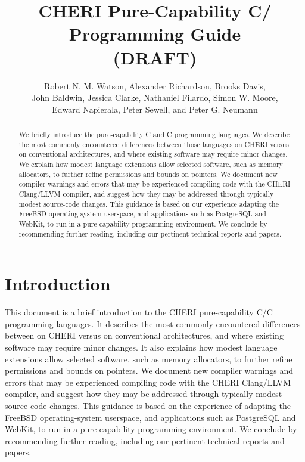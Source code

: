 \documentclass[12pt,twoside,openright,a4paper]{article}
\title{CHERI Pure-Capability C/\cppInHeader{} Programming Guide \\ (DRAFT)}
\author{Robert N. M. Watson, Alexander Richardson, Brooks Davis, \\
  John Baldwin, Jessica Clarke, Nathaniel Filardo, Simon W. Moore, \\
  Edward Napierala, Peter Sewell, and Peter G. Neumann}
\newcommand{\note}[2]{{\color{blue}[ Note: #1 - #2]}}
\renewcommand{\note}[2]{\relax\ifhmode\unskip\fi}
\newcommand{\psnote}[1]{\note{#1}{Peter S.}}
\newcommand*{\cpp}[1][]{C\textsmaller[2]{\nolinebreak[4]\hspace{-.05em}\raisebox{.45ex}{\textbf{++}}}}
\newcommand*{\purecapCOrCpp}[1]{CHERI pure-capability C/\cpp{}}
\begin{document}
\sloppy

\maketitle


%
%
\begin{abstract}
We briefly introduce the pure-capability C and \cpp{} programming languages.
We describe the most commonly encountered differences between
%
those languages on CHERI versus on conventional architectures,
\psnote{that reads as ``differences between C and C++''.  Suggest:
  these CHERI dialects and conventional-architecture C and C++,
  }
and where existing software may
require minor changes.
We explain how modest language extensions allow selected software, such
as memory allocators, to further refine permissions and bounds on pointers.
We document new compiler warnings and errors that may be experienced compiling
code with the CHERI Clang/LLVM compiler, and suggest how they may be addressed
through typically modest source-code changes.
This guidance is based on our experience adapting the FreeBSD operating-system
userspace, and applications such as PostgreSQL and WebKit, to run in a
pure-capability programming environment.
We conclude by recommending further reading, including our pertinent technical
reports and papers.
\end{abstract}

\newpage
\setcounter{tocdepth}{2}
\tableofcontents

\newpage

\section{Introduction}

%
%
This document is a brief introduction to the \purecapCOrCpp{}
programming languages.
It describes the most commonly encountered differences between
on CHERI versus on conventional architectures,
\psnote{same here: that reads as ``differences between C and C++''.  Suggest:
  these CHERI dialects and conventional-architecture C and C++,
  }
and where existing software may
require minor changes.
It also explains how modest language extensions allow selected software, such
as memory allocators, to further refine permissions and bounds on pointers.
We document new compiler warnings and errors that may be experienced compiling
code with the CHERI Clang/LLVM compiler, and suggest how they may be addressed
through typically modest source-code changes.
This guidance is based on the experience of adapting the FreeBSD
operating-system userspace, and applications such as PostgreSQL and WebKit, to
run in a pure-capability programming environment.
We conclude by recommending further reading, including our pertinent technical
reports and papers.
\end{document}
